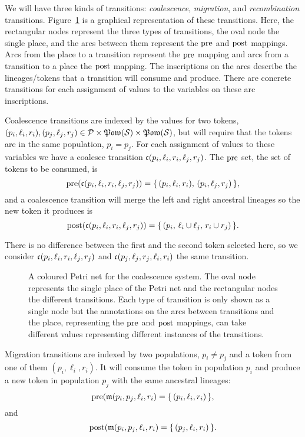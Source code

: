 We will have three kinds of transitions: \emph{coalescence}, \emph{migration}, and \emph{recombination} transitions. Figure~\ref{fig:ctmc-cpn} is a graphical representation of these transitions. Here, the rectangular nodes represent the three types of transitions, the oval node the single place, and the arcs between them represent the $\operatorname{pre}$ and $\operatorname{post}$ mappings. Arcs from the place to a transition represent the $\operatorname{pre}$ mapping and arcs from a transition to a place the $\operatorname{post}$ mapping. The inscriptions on the arcs describe the lineages/tokens that a transition will consume and produce. There are concrete transitions for each assignment of values to the variables on these arc inscriptions.

Coalescence transitions are indexed by the values for two tokens, $(p_i,\ell_i,r_i),(p_j,\ell_j,r_j)\in\mathcal{P}\times\mathfrak{Pow}(\mathcal{S})\times\mathfrak{Pow}(\mathcal{S})$, but will require that the tokens are in the same population, $p_i = p_j$. For each assignment of values to these variables we have a coalesce transition $\mathfrak{c}(p_i,\ell_i,r_i,\ell_j,r_j)$. The $\operatorname{pre}$ set, the set of tokens to be consumed, is
\[
    \operatorname{pre}(\mathfrak{c}(p_i,\ell_i,r_i,\ell_j,r_j)) =
    \{\,(p_i,\ell_i,r_i),\,(p_i,\ell_j,r_j)\,\}
    ,
\]
and a coalescence transition will merge the left and right ancestral lineages so the new token it produces is
\[
    \operatorname{post}(\mathfrak{c}(p_i,\ell_i,r_i,\ell_j,r_j)) =
    \{\,(p_i,\,\ell_i\cup\ell_j,\,r_i\cup r_j)\,\}
    .
\]

There is no difference between the first and the second token selected here, so we consider $\mathfrak{c}(p_i,\ell_i,r_i,\ell_j,r_j)$ and $\mathfrak{c}(p_j,\ell_j,r_j,\ell_i,r_i)$ the same transition.

\begin{figure}[tb]
  \caption{A coloured Petri net for the coalescence system.
  The oval node represents the single place of the Petri net and the rectangular nodes the different transitions. Each type of transition is only shown as a single node but the annotations on the arcs between transitions and the place, representing the $\operatorname{pre}$ and $\operatorname{post}$ mappings, can take different values representing different instances of the transitions.}
  \label{fig:ctmc-cpn}
\end{figure}

Migration transitions are indexed by two populations, $p_i \neq p_j$ and a token from one of them $(p_i,\ell_i,r_i)$. It will consume the token in population $p_i$ and produce a new token in population $p_j$ with the same ancestral lineages:
\[
    \operatorname{pre}(\mathfrak{m}(p_i,p_j,\ell_i,r_i) =
    \{\,(p_i,\ell_i,r_i)\,\}
    ,
\]and\[
    \operatorname{post}(\mathfrak{m}(p_i,p_j,\ell_i,r_i) =
    \{\,(p_j,\ell_i,r_i)\,\}
    .
\]

